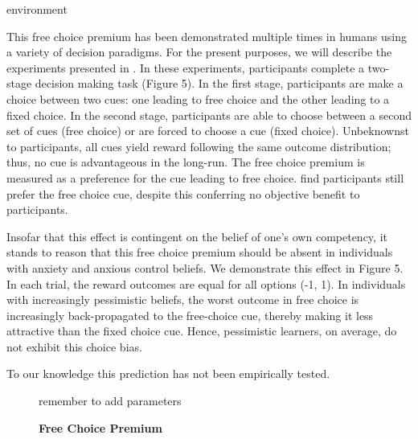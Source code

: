 environment\documentclass[11pt]{article} %
\begin{document}
This free choice premium has been demonstrated multiple times in humans \citep{Suzuki1997,Leotti2011,Leotti2014,Cockburn2014} using a variety of decision
paradigms. For the present purposes, we will describe the experiments presented in
\citep{Leotti2011,Leotti2014}. In these experiments, participants complete a
two-stage decision making task (Figure 5). In the first stage, participants are
make a choice between two cues: one leading to free choice and the other leading
to a fixed choice. In the second stage, participants are able to choose between
a second set of cues (free choice) or are forced to choose a cue (fixed choice).
Unbeknownst to participants, all cues yield reward following the same outcome
distribution; thus, no cue is advantageous in the long-run. The free choice
premium is measured as a preference for the cue leading to free choice. \cite{Leotti2011,Leotti2014}
find participants still prefer the free choice cue, despite this conferring no
objective benefit to participants.

Insofar that this effect is contingent on the belief of one's own competency,
it stands to reason that this free choice premium should be absent in individuals
with anxiety and anxious control beliefs. We demonstrate this effect in Figure 5.
In each trial, the reward outcomes are equal for all options (-1, 1). In individuals
with increasingly pessimistic beliefs, the worst outcome in free choice is increasingly
back-propagated to the free-choice cue, thereby making it less attractive than
the fixed choice cue. Hence, pessimistic learners, on average, do not exhibit
this choice bias.

To our knowledge this prediction has not been empirically tested.

\begin{figure}
  \centerline{%
  }
  \caption{\textbf{Free Choice Premium}}
  \par remember to add parameters
\end{figure}
\end{document}
